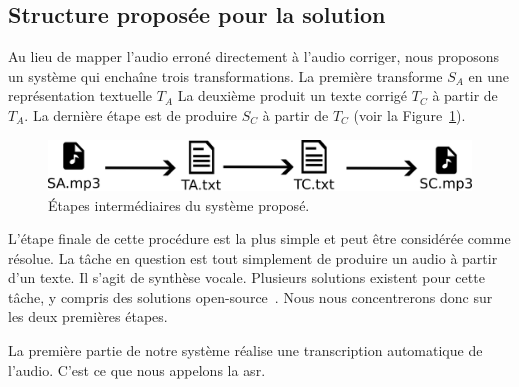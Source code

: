 \subsection{Structure proposée pour la solution}

Au lieu de mapper l'audio erroné directement à l'audio corriger,
nous proposons un système qui enchaîne trois transformations.
La première transforme \(S_A\) en une représentation textuelle \(T_A\)
La deuxième produit un texte corrigé \(T_C\) à partir de \(T_A\).
La dernière étape est de produire \(S_C\) à partir de \(T_C\) (voir la Figure~\ref{fig.detail-system}).

\begin{figure}[hbt]
    \centering
    \includegraphics[width=\linewidth]{assets/images/detail.png}
    \caption{Étapes intermédiaires du système proposé.}
    \label{fig.detail-system}
\end{figure}

L'étape finale de cette procédure est la plus simple et peut être considérée comme résolue.
La tâche en question est tout simplement de produire un audio à partir d'un texte.
Il s'agit de synthèse vocale.
Plusieurs solutions existent pour cette tâche, y compris des solutions open-source~\cite{Tan_et_al._2022}.
Nous nous concentrerons donc sur les deux premières étapes.

La première partie de notre système réalise une transcription automatique de l'audio.
C'est ce que nous appelons la \gls{asr}.
